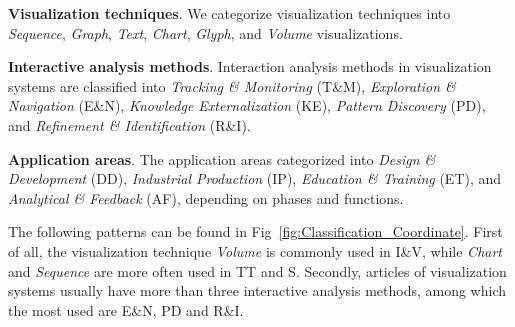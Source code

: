 \documentclass[a4paper,fleqn]{cas-dc}
\begin{document}
 \textbf{Visualization techniques}.
We categorize visualization techniques into \textit{Sequence}, \textit{Graph}, \textit{Text}, \textit{Chart}, \textit{Glyph}, and \textit{Volume} visualizations.

 \textbf{Interactive analysis methods}.
Interaction analysis methods in visualization systems are classified into \textit{Tracking \& Monitoring} (T\&M), \textit{Exploration \& Navigation} (E\&N), \textit{Knowledge Externalization} (KE), \textit{Pattern Discovery} (PD), and \textit{Refinement \& Identification} (R\&I). 

 \textbf{Application areas}.
The application areas categorized into \textit{Design \& Development} (DD), \textit{Industrial Production} (IP), \textit{Education \& Training} (ET), and \textit{Analytical \& Feedback} (AF), depending on phases and functions.

The following patterns can be found in Fig~\ref{fig:Classification_Coordinate}.
First of all, the visualization technique \textit{Volume} is commonly used in I\&V, while \textit{Chart} and \textit{Sequence} are more often used in TT and S. 
Secondly, articles of visualization systems usually have more than three interactive analysis methods, among which the most used are E\&N, PD and R\&I.



\end{document}
